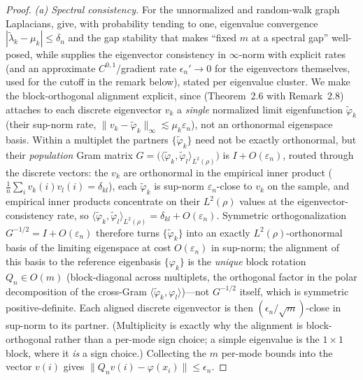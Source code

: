 \documentclass[11pt]{article}
\theoremstyle{remark}
\begin{document}
\begin{proof}
\emph{(a) Spectral consistency.} For the unnormalized and random-walk graph
Laplacians, \cite{calder2022} give, with probability tending to one, eigenvalue
convergence $|\tilde\lambda_k-\mu_k|\le\delta_n$ and the gap stability that makes
``fixed $m$ at a spectral gap'' well-posed, while \cite{calderlewicka2022}
supplies the eigenvector consistency in $\infty$-norm with explicit rates (and an
approximate $C^{0,1}$/gradient rate $\epsilon_n'\to0$ for the eigenvectors
themselves, used for the cutoff in the remark below), stated per eigenvalue
cluster. We make the block-orthogonal alignment explicit, since
\cite{calderlewicka2022} (Theorem~2.6 with Remark~2.8) attaches to each discrete
eigenvector $v_k$ a
\emph{single} normalized limit eigenfunction $\tilde\varphi_k$ (their sup-norm
rate, $\lVert v_k-\tilde\varphi_k\rVert_\infty\lesssim\mu_k\varepsilon_n$), not an
orthonormal eigenspace basis. Within a multiplet the partners
$\{\tilde\varphi_k\}$ need not be exactly orthonormal, but their \emph{population}
Gram matrix $G=\big(\langle\tilde\varphi_k,\tilde\varphi_l\rangle_{L^2(\rho)}\big)$
is $I+O(\varepsilon_n)$, routed through the discrete vectors: the $v_k$ are
orthonormal in the empirical inner product ($\tfrac1n\sum_i v_k(i)v_l(i)=\delta_{kl}$),
each $\tilde\varphi_k$ is sup-norm $\varepsilon_n$-close to $v_k$ on the sample, and
empirical inner products concentrate on their $L^2(\rho)$ values at the
eigenvector-consistency rate, so
$\langle\tilde\varphi_k,\tilde\varphi_l\rangle_{L^2(\rho)}=\delta_{kl}+O(\varepsilon_n)$. Symmetric orthogonalization
$G^{-1/2}=I+O(\varepsilon_n)$ therefore turns $\{\tilde\varphi_k\}$ into an exactly
$L^2(\rho)$-orthonormal basis of the limiting eigenspace at cost $O(\varepsilon_n)$
in sup-norm; the alignment of this basis to the reference eigenbasis
$\{\varphi_k\}$ is the \emph{unique} block rotation $Q_n\in O(m)$ (block-diagonal
across multiplets, the orthogonal factor in the polar decomposition of the
cross-Gram $\langle\tilde\varphi_k,\varphi_l\rangle$)---not $G^{-1/2}$ itself, which
is symmetric positive-definite. Each aligned discrete eigenvector is then
$(\epsilon_n/\sqrt m)$-close in sup-norm to its partner. (Multiplicity is exactly why the alignment is block-orthogonal rather
than a per-mode sign choice; a simple eigenvalue is the $1\times1$ block, where it
\emph{is} a sign choice.) Collecting the $m$ per-mode bounds into the vector $v(i)$
gives $\lVert Q_nv(i)-\varphi(x_i)\rVert\le\epsilon_n$.


\end{proof}
\end{document}
